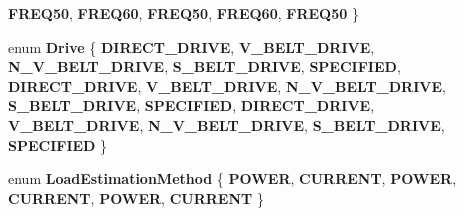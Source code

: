 \begin{DoxyCompactItemize}
{\bfseries F\+R\+E\+Q50}, 
{\bfseries F\+R\+E\+Q60}, 
{\bfseries F\+R\+E\+Q50}, 
\newline
{\bfseries F\+R\+E\+Q60}, 
{\bfseries F\+R\+E\+Q50}
 \}
\item 
\mbox{\label{struct_motor_a7ebc378cf0aee50a8d2b99f0e0a53047}} 
enum {\bfseries Drive} \{ \newline
{\bfseries D\+I\+R\+E\+C\+T\+\_\+\+D\+R\+I\+VE}, 
{\bfseries V\+\_\+\+B\+E\+L\+T\+\_\+\+D\+R\+I\+VE}, 
{\bfseries N\+\_\+\+V\+\_\+\+B\+E\+L\+T\+\_\+\+D\+R\+I\+VE}, 
{\bfseries S\+\_\+\+B\+E\+L\+T\+\_\+\+D\+R\+I\+VE}, 
\newline
{\bfseries S\+P\+E\+C\+I\+F\+I\+ED}, 
{\bfseries D\+I\+R\+E\+C\+T\+\_\+\+D\+R\+I\+VE}, 
{\bfseries V\+\_\+\+B\+E\+L\+T\+\_\+\+D\+R\+I\+VE}, 
{\bfseries N\+\_\+\+V\+\_\+\+B\+E\+L\+T\+\_\+\+D\+R\+I\+VE}, 
\newline
{\bfseries S\+\_\+\+B\+E\+L\+T\+\_\+\+D\+R\+I\+VE}, 
{\bfseries S\+P\+E\+C\+I\+F\+I\+ED}, 
{\bfseries D\+I\+R\+E\+C\+T\+\_\+\+D\+R\+I\+VE}, 
{\bfseries V\+\_\+\+B\+E\+L\+T\+\_\+\+D\+R\+I\+VE}, 
\newline
{\bfseries N\+\_\+\+V\+\_\+\+B\+E\+L\+T\+\_\+\+D\+R\+I\+VE}, 
{\bfseries S\+\_\+\+B\+E\+L\+T\+\_\+\+D\+R\+I\+VE}, 
{\bfseries S\+P\+E\+C\+I\+F\+I\+ED}
 \}
\item 
\mbox{\label{struct_motor_a6f8326215d659b4e6961510281e4af4b}} 
enum {\bfseries Load\+Estimation\+Method} \{ \newline
{\bfseries P\+O\+W\+ER}, 
{\bfseries C\+U\+R\+R\+E\+NT}, 
{\bfseries P\+O\+W\+ER}, 
{\bfseries C\+U\+R\+R\+E\+NT}, 
\newline
{\bfseries P\+O\+W\+ER}, 
{\bfseries C\+U\+R\+R\+E\+NT}
 \}
\end{DoxyCompactItemize}
